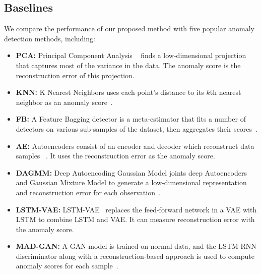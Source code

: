 \documentclass[letterpaper]{article} %
\begin{document}
\subsection{Baselines}
We compare the performance of our proposed method with five popular anomaly detection methods, including:
\begin{itemize}
    \item \textbf{\textsc{PCA:}}  Principal Component Analysis ~\cite{pca} finds a low-dimensional projection that captures most of the variance in the data. The anomaly score is the reconstruction error of this projection.
    \item \textbf{\textsc{KNN:} } K Nearest Neighbors uses each point's distance to its $k$th nearest neighbor as an anomaly score~\cite{knn}.
    \item \textbf{\textsc{FB:}} A Feature Bagging detector is a meta-estimator that fits a number of detectors on various sub-samples of the dataset, then aggregates their scores~\cite{featurebagging}.
    \item \textbf{\textsc{AE:}} Autoencoders consist of an encoder and decoder which reconstruct data samples ~\cite{autoencoding}. It uses the reconstruction error as the anomaly score.
    \item \textbf{\textsc{DAGMM:}} Deep Autoencoding Gaussian Model joints deep Autoencoders and Gaussian Mixture Model to generate a low-dimensional representation and reconstruction error for each observation~\cite{dagmm}.
    \item \textbf{\textsc{LSTM-VAE:}} LSTM-VAE~\cite{lstmvae} replaces the feed-forward network in a VAE with LSTM to combine LSTM and VAE. It can measure reconstruction error with the anomaly score.
    \item \textbf{\textsc{MAD-GAN:}} A GAN model is trained on normal data, and the LSTM-RNN discriminator along with a reconstruction-based approach is used to compute anomaly scores for each sample~\cite{li2019mad}.
\end{itemize}
\end{document}
